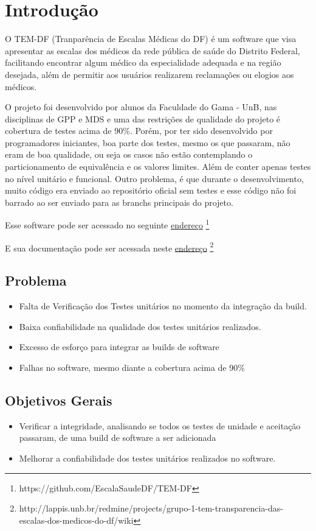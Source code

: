 \chapter[Introdução]{Introdução}

O TEM-DF (Tranparência de Escalas Médicas do DF) é um software que visa apresentar as escalas dos médicos da rede pública de saúde do Distrito Federal, facilitando encontrar algum médico da especialidade adequada e na região desejada, além de permitir aos usuários realizarem reclamações ou elogios aos médicos.


O projeto foi desenvolvido por alunos da Faculdade do Gama - UnB, nas disciplinas de GPP e MDS e uma das restrições de qualidade do projeto é cobertura de testes acima de 90\%. Porém, por ter sido desenvolvido por programadores iniciantes, boa parte dos testes, mesmo os que passaram, não eram de boa qualidade, ou seja os casos não estão contemplando o particionamento de equivalência e os valores limites. Além de conter apenas testes no nível unitário e funcional. Outro problema, é que durante o desenvolvimento, muito código era enviado ao repositório oficial sem testes e esse código não foi barrado ao ser enviado para as branchs principais do projeto.


Esse software pode ser acessado no seguinte \href{https://github.com/EscalaSaudeDF/TEM-DF}{endereço}%
\footnote{https://github.com/EscalaSaudeDF/TEM-DF}

E sua documentação pode ser acessada neste \href{http://lappis.unb.br/redmine/projects/grupo-1-tem-transparencia-das-escalas-dos-medicos-do-df/wiki}{endereço}%
\footnote{http://lappis.unb.br/redmine/projects/grupo-1-tem-transparencia-das-escalas-dos-medicos-do-df/wiki}


\section{Problema}
\begin{itemize}
\item Falta de Verificação dos Testes unitários no momento da integração da build.
\item Baixa confiabilidade na qualidade dos testes unitários realizados.
\item Excesso de esforço para integrar as builds de software
\item Falhas no software, mesmo diante a cobertura acima de 90\%
\end{itemize}

\section{Objetivos Gerais}
\begin{itemize}
    \item Verificar a integridade, analisando se todos os testes de unidade e aceitação passaram, de uma build de software a ser adicionada
    \item Melhorar a confiabilidade dos testes unitários realizados no software.
\end{itemize}

